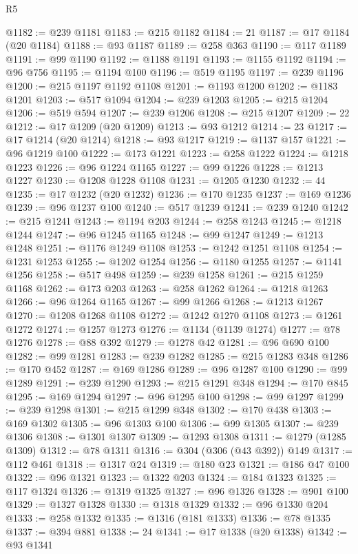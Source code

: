 \begin{lexlean}{R5}
\begin{coremodule}
@1182 := @239 @1181
@1183 := @215 @1182
@1184 := 21
@1187 := @17 @1184 (@20 @1184)
@1188 := @93 @1187
@1189 := @258 @363
@1190 := @117 @1189
@1191 := @99 @1190
@1192 := @1188 @1191
@1193 := @1155 @1192
@1194 := @96 @756
@1195 := @1194 @100
@1196 := @519 @1195
@1197 := @239 @1196
@1200 := @215 @1197 @1192 @1108
@1201 := @1193 @1200
@1202 := @1183 @1201
@1203 := @517 @1094
@1204 := @239 @1203
@1205 := @215 @1204
@1206 := @519 @594
@1207 := @239 @1206
@1208 := @215 @1207
@1209 := 22
@1212 := @17 @1209 (@20 @1209)
@1213 := @93 @1212
@1214 := 23
@1217 := @17 @1214 (@20 @1214)
@1218 := @93 @1217
@1219 := @1137 @157
@1221 := @96 @1219 @100
@1222 := @173 @1221
@1223 := @258 @1222
@1224 := @1218 @1223
@1226 := @96 @1224 @1165
@1227 := @99 @1226
@1228 := @1213 @1227
@1230 := @1208 @1228 @1108
@1231 := @1205 @1230
@1232 := 44
@1235 := @17 @1232 (@20 @1232)
@1236 := @170 @1235
@1237 := @169 @1236
@1239 := @96 @1237 @100
@1240 := @517 @1239
@1241 := @239 @1240
@1242 := @215 @1241
@1243 := @1194 @203
@1244 := @258 @1243
@1245 := @1218 @1244
@1247 := @96 @1245 @1165
@1248 := @99 @1247
@1249 := @1213 @1248
@1251 := @1176 @1249 @1108
@1253 := @1242 @1251 @1108
@1254 := @1231 @1253
@1255 := @1202 @1254
@1256 := @1180 @1255
@1257 := @1141 @1256
@1258 := @517 @498
@1259 := @239 @1258
@1261 := @215 @1259 @1168
@1262 := @173 @203
@1263 := @258 @1262
@1264 := @1218 @1263
@1266 := @96 @1264 @1165
@1267 := @99 @1266
@1268 := @1213 @1267
@1270 := @1208 @1268 @1108
@1272 := @1242 @1270 @1108
@1273 := @1261 @1272
@1274 := @1257 @1273
@1276 := @1134 (@1139 @1274)
@1277 := @78 @1276
@1278 := @88 @392
@1279 := @1278 @42
@1281 := @96 @690 @100
@1282 := @99 @1281
@1283 := @239 @1282
@1285 := @215 @1283 @348
@1286 := @170 @452
@1287 := @169 @1286
@1289 := @96 @1287 @100
@1290 := @99 @1289
@1291 := @239 @1290
@1293 := @215 @1291 @348
@1294 := @170 @845
@1295 := @169 @1294
@1297 := @96 @1295 @100
@1298 := @99 @1297
@1299 := @239 @1298
@1301 := @215 @1299 @348
@1302 := @170 @438
@1303 := @169 @1302
@1305 := @96 @1303 @100
@1306 := @99 @1305
@1307 := @239 @1306
@1308 := @1301 @1307
@1309 := @1293 @1308
@1311 := @1279 (@1285 @1309)
@1312 := @78 @1311
@1316 := @304 (@306 (@43 @392)) @149
@1317 := @112 @461
@1318 := @1317 @24
@1319 := @180 @23
@1321 := @186 @47 @100
@1322 := @96 @1321
@1323 := @1322 @203
@1324 := @184 @1323
@1325 := @117 @1324
@1326 := @1319 @1325
@1327 := @96 @1326
@1328 := @901 @100
@1329 := @1327 @1328
@1330 := @1318 @1329
@1332 := @96 @1330 @204
@1333 := @258 @1332
@1335 := @1316 (@181 @1333)
@1336 := @78 @1335
@1337 := @394 @881
@1338 := 24
@1341 := @17 @1338 (@20 @1338)
@1342 := @93 @1341

\end{coremodule}
\end{lexlean}
